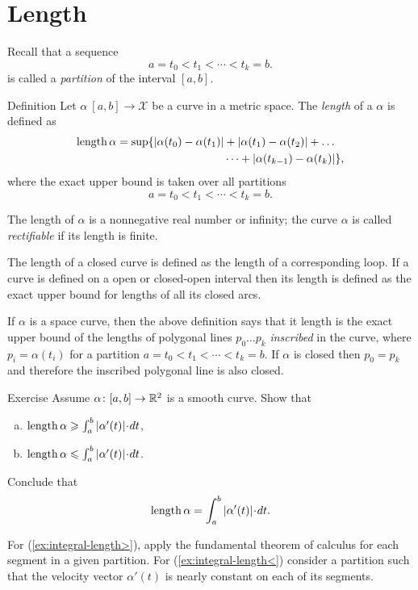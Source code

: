 \chapter{Length}
 
Recall that a sequence 
\[a=t_0 < t_1 < \cdots < t_k=b.\]
is called a \emph{partition} of the interval $[a,b]$.

\begin{thm}{Definition}\label{def:length}
Let $\alpha\:[a,b]\to \mathcal{X}$ be a curve in a metric space.
The \emph{length} of a $\alpha$ is defined as
\begin{align*}
\mathop{\rm length}\nolimits \alpha
= 
\sup \{|\alpha(t_0)-\alpha(t_1)|&+|\alpha(t_1)-\alpha(t_2)|+\dots
\\
&\dots+|\alpha(t_{k-1})-\alpha(t_k)|\},
\end{align*}
where the exact upper bound is taken over all partitions
\[a=t_0 < t_1 < \cdots < t_k=b.\]

The length of $\alpha$ is a nonnegative real number or infinity;
the curve $\alpha$ is called \emph{rectifiable} if its length is finite. 

The length of a closed curve is defined as the length of a corresponding loop.
If a curve is defined on a open or closed-open interval then its length is defined as the exact upper bound for lengths of all its closed arcs.
\end{thm}

If $\alpha$ is a space curve, then the above definition says that it length is the exact upper bound of the lengths of polygonal lines $p_0\dots p_k$ \emph{inscribed} in the curve, where $p_i=\alpha(t_i)$ for a  partition $a=t_0 < t_1 < \cdots < t_k=b$.
If $\alpha$ is closed then $p_0=p_k$ and therefore the inscribed polygonal line is also closed.

\begin{thm}{Exercise}\label{ex:integral-length}
Assume $\alpha\colon[a,b]\to\mathbb{R}^2$ is a smooth curve.
Show that
\begin{enumerate}[(a)]
\item\label{ex:integral-length>} $\length \alpha\ge \int_a^b|\alpha'(t)|\cdot dt$,
\item\label{ex:integral-length<} $\length \alpha\le \int_a^b|\alpha'(t)|\cdot dt$.
\end{enumerate}
Conclude that 
\[\length \alpha= \int_a^b|\alpha'(t)|\cdot dt.\]
\end{thm}

 For (\ref{ex:integral-length>}), apply the fundamental theorem of calculus for each segment in a given partition. For (\ref{ex:integral-length<}) consider a partition such that the velocity vector $\alpha'(t)$ is nearly constant on each of its segments.

